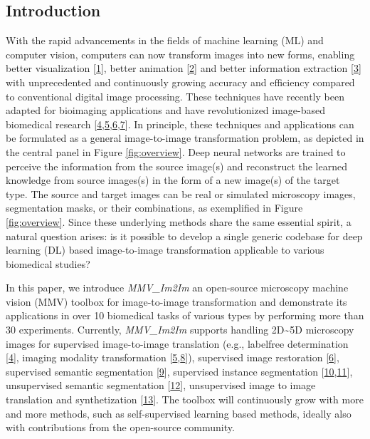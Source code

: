 \hypertarget{introduction}{%
\subsection{Introduction}\label{introduction}}

With the rapid advancements in the fields of machine learning (ML) and computer vision, computers can now transform images into new forms, enabling better visualization {[}\protect\hyperlink{ref-1O0bopKD}{1}{]}, better animation {[}\protect\hyperlink{ref-LxlUp436}{2}{]} and better information extraction {[}\protect\hyperlink{ref-11chATuF4}{3}{]} with unprecedented and continuously growing accuracy and efficiency compared to conventional digital image processing. These techniques have recently been adapted for bioimaging applications and have revolutionized image-based biomedical research {[}\protect\hyperlink{ref-Yq8wZ6hc}{4},\protect\hyperlink{ref-WwenuBHa}{5},\protect\hyperlink{ref-wcCVn8av}{6},\protect\hyperlink{ref-xPgDok51}{7}{]}. In principle, these techniques and applications can be formulated as a general image-to-image transformation problem, as depicted in the central panel in Figure \ref{fig:overview}. Deep neural networks are trained to perceive the information from the source image(s) and reconstruct the learned knowledge from source images(s) in the form of a new image(s) of the target type. The source and target images can be real or simulated microscopy images, segmentation masks, or their combinations, as exemplified in Figure \ref{fig:overview}. Since these underlying methods share the same essential spirit, a natural question arises: is it possible to develop a single generic codebase for deep learning (DL) based image-to-image transformation applicable to various biomedical studies?

In this paper, we introduce \emph{MMV\_Im2Im} an open-source microscopy machine vision (MMV) toolbox for image-to-image transformation and demonstrate its applications in over 10 biomedical tasks of various types by performing more than 30 experiments. Currently, \emph{MMV\_Im2Im} supports handling 2D\textasciitilde5D microscopy images for supervised image-to-image translation (e.g., labelfree determination {[}\protect\hyperlink{ref-Yq8wZ6hc}{4}{]}, imaging modality transformation {[}\protect\hyperlink{ref-WwenuBHa}{5},\protect\hyperlink{ref-UEBDZ3tI}{8}{]}), supervised image restoration {[}\protect\hyperlink{ref-wcCVn8av}{6}{]}, supervised semantic segmentation {[}\protect\hyperlink{ref-TutLhFSz}{9}{]}, supervised instance segmentation {[}\protect\hyperlink{ref-K2ugNcVa}{10},\protect\hyperlink{ref-QmYuUQ5K}{11}{]}, unsupervised semantic segmentation {[}\protect\hyperlink{ref-RuFP3CS3}{12}{]}, unsupervised image to image translation and synthetization {[}\protect\hyperlink{ref-6wtIu4QY}{13}{]}. The toolbox will continuously grow with more and more methods, such as self-supervised learning based methods, ideally also with contributions from the open-source community.

